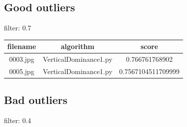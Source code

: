\documentclass[a4paper,10pt]{article}
\begin{document}
\subsection*{Good outliers}
filter: 0.7

				\begin{table}[htbp]
				\centering
				\begin{tabular}{|c|c|c|}
				\hline
				filename&algorithm&score\\
				\hline
				0003.jpg&VerticalDominance1.py&0.766761768902\\
0005.jpg&VerticalDominance1.py&0.7567104511709999\\

				\hline
				\end{tabular}
				\end{table}
				 
\subsection*{Bad outliers}
filter: 0.4
\end{document}

